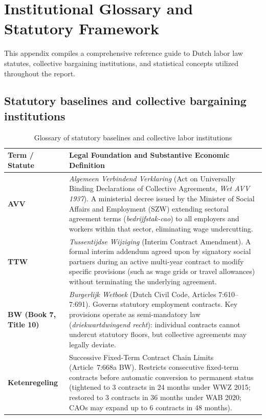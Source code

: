\section{Institutional Glossary and Statutory Framework}
\label{app:glossary}

This appendix compiles a comprehensive reference guide to Dutch labor law statutes, collective bargaining institutions, and statistical concepts utilized throughout the report.

\subsection*{Statutory baselines and collective bargaining institutions}

\begin{table}[H]
    \centering
    \caption{Glossary of statutory baselines and collective labor institutions}
    \label{tab:glossary_statutory}
    \small
    \begin{tabular}{lp{11.2cm}}
        \hline\hline
        Term / Statute & Legal Foundation and Substantive Economic Definition \\
        \hline
        \textbf{AVV} & \emph{Algemeen Verbindend Verklaring} (Act on Universally Binding Declarations of Collective Agreements, \emph{Wet AVV 1937}). A ministerial decree issued by the Minister of Social Affairs and Employment (SZW) extending sectoral agreement terms (\emph{bedrijfstak-cao}) to all employers and workers within that sector, eliminating wage undercutting. \\
        \textbf{TTW} & \emph{Tussentijdse Wijziging} (Interim Contract Amendment). A formal interim addendum agreed upon by signatory social partners during an active multi-year contract to modify specific provisions (such as wage grids or travel allowances) without terminating the underlying agreement. \\
        \textbf{BW (Book 7, Title 10)} & \emph{Burgerlijk Wetboek} (Dutch Civil Code, Articles 7:610--7:691). Governs statutory employment contracts. Key provisions operate as semi-mandatory law (\emph{driekwartdwingend recht}): individual contracts cannot undercut statutory floors, but collective agreements may legally deviate. \\
        \textbf{Ketenregeling} & Successive Fixed-Term Contract Chain Limits (Article~7:668a BW). Restricts consecutive fixed-term contracts before automatic conversion to permanent status (tightened to 3 contracts in 24 months under WWZ 2015; restored to 3 contracts in 36 months under WAB 2020; CAOs may expand up to 6 contracts in 48 months). \\

\end{tabular}
\end{table}
